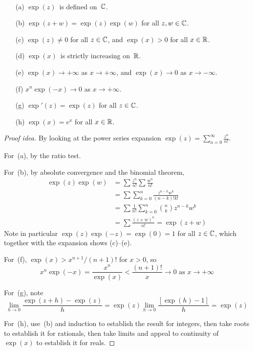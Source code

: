 \begin{thm}
\ 
\begin{enumerate}[itemsep=0pt]
\item[(a)] \(\exp(z)\)~is defined on~\(\mathbb{C}\).
\item[(b)] \(\exp(z+w)=\exp(z)\exp(w)\) for all \(z,w\in\mathbb{C}\).
\item[(c)] \(\exp(z)\ne0\) for all \(z\in\mathbb{C}\), and \(\exp(x)>0\) for all \(x\in\mathbb{R}\).
\item[(d)] \(\exp(x)\)~is strictly increasing on~\(\mathbb{R}\).
\item[(e)] \(\exp(x)\to+\infty\) as \(x\to+\infty\), and \(\exp(x)\to0\) as \(x\to-\infty\).
\item[(f)] \(x^n\exp(-x)\to0\) as \(x\to+\infty\).
\item[(g)] \(\exp'(z)=\exp(z)\) for all \(z\in\mathbb{C}\).
\item[(h)] \(\exp(x)=e^x\) for all \(x\in\mathbb{R}\).
\end{enumerate}
\end{thm}
\begin{proof}[Proof idea]
By looking at the power series expansion \(\exp(z)=\sum_{n=0}^\infty\frac{z^n}{n!}\).

For~(a), by the ratio test.

For~(b), by absolute convergence and the binomial theorem,
\begin{align*}
\exp(z)\exp(w)&=\sum\frac{z^n}{n!}\sum\frac{w^n}{n!}\\
	&=\sum\sum_{k=0}^n\frac{z^{n-k}w^k}{(n-k)!k!}\\
	&=\sum\frac{1}{n!}\sum_{k=0}^n\binom{n}{k}z^{n-k}w^k\\
	&=\sum\frac{(z+w)^n}{n!}=\exp(z+w)
\end{align*}
Note in particular \(\exp(z)\exp(-z)=\exp(0)=1\) for all \(z\in\mathbb{C}\), which together with the expansion shows (c)--(e).

For~(f), \(\exp(x)>x^{n+1}/(n+1)!\) for \(x>0\), so
\[x^n\exp(-x)=\frac{x^n}{\exp(x)}<\frac{(n+1)!}{x}\to0\text{ as }x\to+\infty\]

For~(g), note
\[\lim_{h\to0}\frac{\exp(z+h)-\exp(z)}{h}=\exp(z)\lim_{h\to0}\frac{[\exp(h)-1]}{h}=\exp(z)\]

For~(h), use~(b) and induction to establish the result for integers, then take roots to establish it for rationals, then take limits and appeal to continuity of~\(\exp(x)\) to establish it for reals.
\end{proof}

